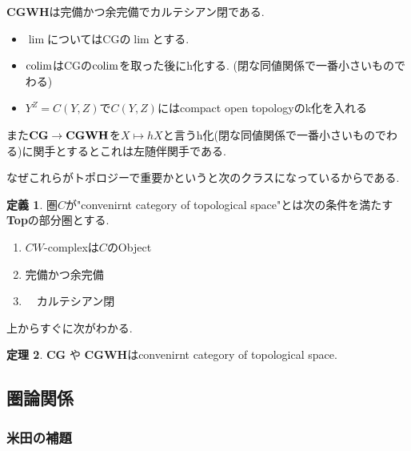 \documentclass[dvipdfmx,a4paper,11pt]{article}
\newcommand{\colim}{{\rm colim}}
\theoremstyle{definition}
\newtheorem{thm}{定理}
\newtheorem{dfn}[thm]{定義}
\begin{document}
\begin{tcolorbox}
 [colback = white, colframe = green!35!black, fonttitle = \bfseries,breakable = true]
 {\bf CGWH}は完備かつ余完備でカルテシアン閉である.
 \begin{itemize}
 \item $\lim$についてはCGの$\lim$とする. 
 \item $\colim$はCGの$\colim$を取った後にh化する. (閉な同値関係で一番小さいものでわる)
 \item $Y^{Z} = C(Y,Z)$で$C(Y,Z)$にはcompact open topologyのk化を入れる
 \end{itemize}
  また$ {\bf CG}\to { \bf CGWH }$を$X \mapsto hX$と言うh化(閉な同値関係で一番小さいものでわる)に関手とするとこれは左随伴関手である. 
\end{tcolorbox}

なぜこれらがトポロジーで重要かというと次のクラスになっているからである.
\begin{tcolorbox}
 [colback = white, colframe = green!35!black, fonttitle = \bfseries,breakable = true]
 \begin{dfn}
圏$C$が"convenirnt category of topological space"とは次の条件を満たす{\bf Top}の部分圏とする.
\begin{enumerate}
\item $CW$-complexは$C$のObject
\item 完備かつ余完備
\item　カルテシアン閉
\end{enumerate}
  \end{dfn}
\end{tcolorbox}

上からすぐに次がわかる. 

\begin{tcolorbox}
 [colback = white, colframe = green!35!black, fonttitle = \bfseries,breakable = true]
\begin{thm}
{\bf CG} や {\bf CGWH}はconvenirnt category of topological space.
\end{thm}
\end{tcolorbox}

 \subsection{圏論関係}
 
 \subsubsection{米田の補題}
 
\end{document}
